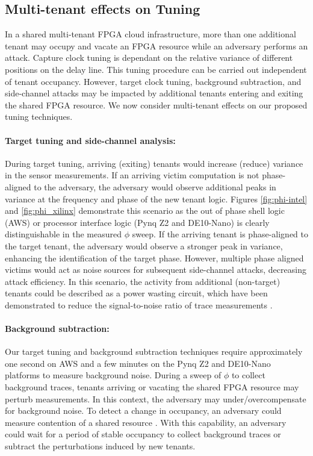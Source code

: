 \subsection{Multi-tenant effects on Tuning}

In a shared multi-tenant FPGA cloud infrastructure, more than one additional tenant may occupy and vacate an FPGA resource while an adversary performs an attack. Capture clock tuning is dependant on the relative variance of different positions on the delay line. This tuning procedure can be carried out independent of tenant occupancy. However, target clock tuning, background subtraction, and side-channel attacks may be impacted by additional tenants entering and exiting the shared FPGA resource. We now consider multi-tenant effects on our proposed tuning techniques.

\paragraph{Target tuning and side-channel analysis: } During target tuning, arriving (exiting) tenants would increase (reduce) variance in the sensor measurements. If an arriving victim computation is not phase-aligned to the adversary, the adversary would observe additional peaks in variance at the frequency and phase of the new tenant logic. Figures \ref{fig:phi-intel} and \ref{fig:phi_xilinx} demonstrate this scenario as the out of phase shell logic (AWS) or processor interface logic (Pynq Z2 and DE10-Nano) is clearly distinguishable in the measured $\phi$ sweep. If the arriving tenant is phase-aligned to the target tenant, the adversary would observe a stronger peak in variance, enhancing the identification of the target phase. However, multiple phase aligned victims would act as noise sources for subsequent side-channel attacks, decreasing attack efficiency. In this scenario, the activity from additional (non-target) tenants could be described as a power wasting circuit, which have been demonstrated to reduce the signal-to-noise ratio of trace measurements \cite{krautter2019active}.

\paragraph{Background subtraction: } Our target tuning and background subtraction techniques require approximately one second on AWS and a few minutes on the Pynq Z2 and DE10-Nano platforms to measure background noise. During a sweep of $\phi$ to collect background traces, tenants arriving or vacating the shared FPGA resource may perturb measurements. In this context, the adversary may under/overcompensate for background noise. To detect a change in occupancy, an adversary could measure contention of a shared resource \cite{giechaskiel2022cross}. With this capability, an adversary could wait for a period of stable occupancy to collect background traces or subtract the perturbations induced by new tenants.
